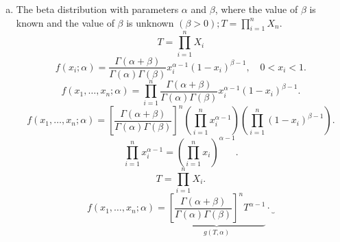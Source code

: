 \documentclass{article}
\begin{document}
\begin{enumerate}[(a)]
	      the value of $\beta$ is unknown $(\beta>0);T= \prod^{n}_{i=1}X_n$.
	      \[
		      T = \prod_{i=1}^{n} X_i
	      \]
	      \[
		      f(x_i;\alpha)
		      = \frac{1}{\Gamma(\alpha)\beta^{\alpha}}
		      x_i^{\alpha-1}
		      \exp\!\left(-\frac{x_i}{\beta}\right),
		      \quad x_i>0.
	      \]
	      \[
		      f(x_1,\dots,x_n;\alpha)
		      =
		      \prod_{i=1}^{n}
		      \frac{1}{\Gamma(\alpha)\beta^{\alpha}}
		      x_i^{\alpha-1}
		      \exp\!\left(-\frac{x_i}{\beta}\right).
	      \]
	      \[
		      f(x_1,\dots,x_n;\alpha)
		      =
		      \frac{1}{\Gamma(\alpha)^n \beta^{n\alpha}}
		      \left(\prod_{i=1}^{n} x_i^{\alpha-1}\right)
		      \exp\!\left(-\frac{\sum_{i=1}^{n} x_i}{\beta}\right).
	      \]
	      \[
		      \prod_{i=1}^{n} x_i^{\alpha-1}
		      =
		      \left(\prod_{i=1}^{n} x_i\right)^{\alpha-1}.
	      \]
	      \[
		      T = \prod_{i=1}^{n} X_i.
	      \]
	      \[
		      f(x_1,\dots,x_n;\alpha)
		      =
		      \underbrace{
			      \Gamma(\alpha)^{-n}
			      \beta^{-n\alpha}
			      T^{\alpha-1}
		      }_{g(T,\alpha)}
		      \cdot
		      \underbrace{
			      \exp\!\left(-\frac{\sum_{i=1}^{n} x_i}{\beta}\right)
		      }_{h(x_1,\dots,x_n)}.
	      \]
	      \[
		      \boxed{
			      T = \prod_{i=1}^{n} X_i
			      \text{ is a sufficient statistic for } \alpha.
		      }
	      \]
	\item The beta distribution with parameters $\alpha$ and $\beta$, where the value of $\beta$ is known and
	      the value of $\beta$ is unknown $(\beta>0);T= \prod^{n}_{i=1}X_n$.
	      \[
		      T = \prod_{i=1}^{n} X_i
	      \]
	      \[
		      f(x_i;\alpha) = \frac{\Gamma(\alpha+\beta)}{\Gamma(\alpha)\Gamma(\beta)}
		      x_i^{\alpha-1} (1-x_i)^{\beta-1}, \quad 0<x_i<1.
	      \]
	      \[
		      f(x_1,\dots,x_n;\alpha)
		      = \prod_{i=1}^{n} \frac{\Gamma(\alpha+\beta)}{\Gamma(\alpha)\Gamma(\beta)}
		      x_i^{\alpha-1} (1-x_i)^{\beta-1}.
	      \]
	      \[
		      f(x_1,\dots,x_n;\alpha)
		      = \left[ \frac{\Gamma(\alpha+\beta)}{\Gamma(\alpha)\Gamma(\beta)} \right]^n
		      \left( \prod_{i=1}^{n} x_i^{\alpha-1} \right)
		      \left( \prod_{i=1}^{n} (1-x_i)^{\beta-1} \right).
	      \]
	      \[
		      \prod_{i=1}^{n} x_i^{\alpha-1} = \left( \prod_{i=1}^{n} x_i \right)^{\alpha-1}.
	      \]
	      \[
		      T = \prod_{i=1}^{n} X_i.
	      \]
	      \[
		      f(x_1,\dots,x_n;\alpha)
		      =
		      \underbrace{
			      \left[ \frac{\Gamma(\alpha+\beta)}{\Gamma(\alpha)\Gamma(\beta)} \right]^n
			      T^{\alpha-1}
		      }_{g(T,\alpha)}
		      \cdot
		      \underbrace{
}\]
\end{enumerate}
\end{document}
